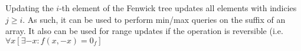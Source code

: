 Updating the $i$-th element of the Fenwick tree updates all elements with indicies $j \geq i$. As such, it can be used to perform min/max queries on the suffix of an array. It also can be used for range updates if the operation is reversible (i.e. $\forall x\left[\exists -x: f(x, -x) = 0_f\right]$



